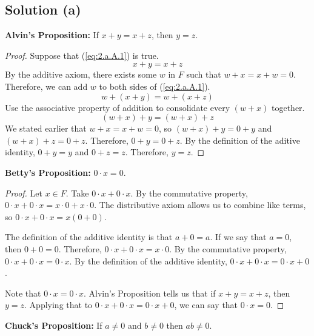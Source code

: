 \documentclass[11pt]{article}
\begin{document}
    \subsection{Solution (a)}
    \textbf{Alvin's Proposition:} If $x + y = x + z$, then $y = z$.
    \begin{proof}
        Suppose that (\ref{eq:2.a.A.1}) is true.
        \begin{equation}
            \label{eq:2.a.A.1}
            x + y = x + z
        \end{equation}
        By the additive axiom, there exists some $w$ in $F$ such that $w + x = x + w = 0$.
        Therefore, we can add $w$ to both sides of (\ref{eq:2.a.A.1}).
        \begin{equation}
            \label{eq:2.a.A.2}
            w + (x + y) = w + (x + z)
        \end{equation}
        Use the associative property of addition to consolidate every $(w + x)$ together.
        \begin{equation}
            \label{eq:2.a.A.3}
            (w + x) + y = (w + x) + z
        \end{equation} 
        We stated earlier that $w + x = x + w = 0$, so $(w + x) + y = 0 + y$ and $(w + x) + z = 0 + z$.
        Therefore, $0 + y = 0 + z$.
        By the definition of the aditive identity, $0 + y = y$ and $0 + z = z$.
        Therefore, $y = z$.
    \end{proof}
    \textbf{Betty's Proposition:} $0 \cdot x = 0$.
    \begin{proof}
        Let $x \in F$.
        Take $0 \cdot x + 0 \cdot x$.
        By the commutative property, $0 \cdot x + 0 \cdot x = x \cdot 0 + x \cdot 0$.
        The distributive axiom allows us to combine like terms, so $0 \cdot x + 0 \cdot x = x(0 + 0)$.
        
        The definition of the additive identity is that $a + 0 = a$.
        If we say that $a = 0$, then $0 + 0 = 0$.
        Therefore, $0 \cdot x + 0 \cdot x = x \cdot 0$.
        By the commutative property, $0 \cdot x + 0 \cdot x = 0 \cdot x$.
        By the definition of the additive identity, $0 \cdot x + 0 \cdot x = 0 \cdot x + 0$.

        Note that $0 \cdot x = 0 \cdot x$.
        Alvin's Proposition tells us that if $x + y = x + z$, then $y = z$.
        Applying that to $0 \cdot x + 0 \cdot x = 0 \cdot x + 0$, we can say that $0 \cdot x = 0$.
    \end{proof}
    \textbf{Chuck's Proposition:} If $a \neq 0$ and $b \neq 0$ then $ab \neq 0$.
\end{document}
